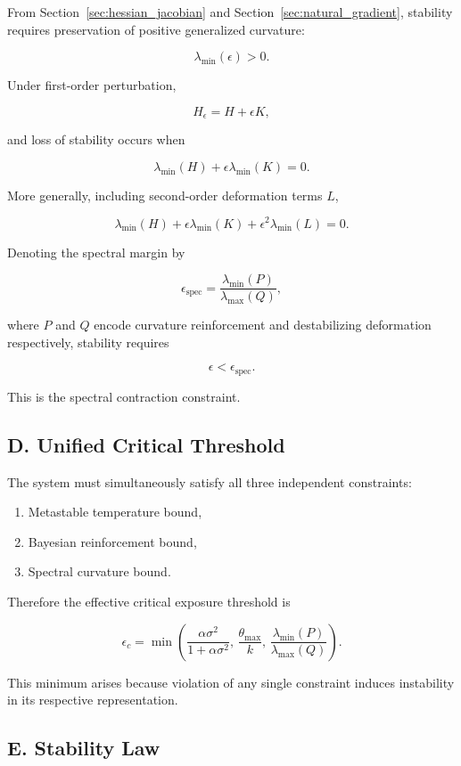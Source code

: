 \documentclass[11pt]{article}
\theoremstyle{remark}
\begin{document}
From Section~\ref{sec:hessian_jacobian} and Section~\ref{sec:natural_gradient}, stability requires preservation of positive generalized curvature:

\[
\lambda_{\min}(\epsilon) > 0.
\]

Under first-order perturbation,

\[
H_\epsilon = H + \epsilon K,
\]

and loss of stability occurs when

\[
\lambda_{\min}(H) + \epsilon \lambda_{\min}(K) = 0.
\]

More generally, including second-order deformation terms $L$,

\[
\lambda_{\min}(H) + \epsilon \lambda_{\min}(K) + \epsilon^2 \lambda_{\min}(L) = 0.
\]

Denoting the spectral margin by

\[
\epsilon_{\text{spec}} = \frac{\lambda_{\min}(P)}{\lambda_{\max}(Q)},
\]

where $P$ and $Q$ encode curvature reinforcement and destabilizing deformation respectively, stability requires

\[
\epsilon < \epsilon_{\text{spec}}.
\]

This is the spectral contraction constraint.

\subsection*{D. Unified Critical Threshold}

The system must simultaneously satisfy all three independent constraints:

\begin{enumerate}
\item Metastable temperature bound,
\item Bayesian reinforcement bound,
\item Spectral curvature bound.
\end{enumerate}

Therefore the effective critical exposure threshold is

\[
\epsilon_c =
\min\left(
\frac{\alpha \sigma^2}{1 + \alpha \sigma^2},\,
\frac{\theta_{\max}}{k},\,
\frac{\lambda_{\min}(P)}{\lambda_{\max}(Q)}
\right).
\]

This minimum arises because violation of any single constraint induces instability in its respective representation.

\subsection*{E. Stability Law}
\end{document}
